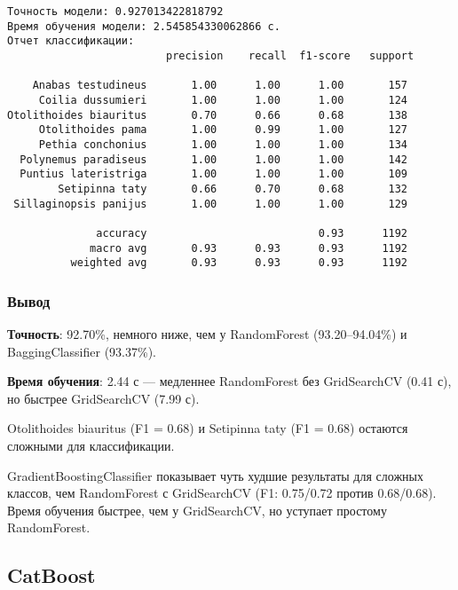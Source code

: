 \documentclass[14pt,a4paper,oneside]{extarticle}
\begin{document}
    \begin{Verbatim}[commandchars=\\\{\}]
Точность модели: 0.927013422818792
Время обучения модели: 2.545854330062866 с.
Отчет классификации:
                         precision    recall  f1-score   support

    Anabas testudineus       1.00      1.00      1.00       157
     Coilia dussumieri       1.00      1.00      1.00       124
Otolithoides biauritus       0.70      0.66      0.68       138
     Otolithoides pama       1.00      0.99      1.00       127
     Pethia conchonius       1.00      1.00      1.00       134
  Polynemus paradiseus       1.00      1.00      1.00       142
  Puntius lateristriga       1.00      1.00      1.00       109
        Setipinna taty       0.66      0.70      0.68       132
 Sillaginopsis panijus       1.00      1.00      1.00       129

              accuracy                           0.93      1192
             macro avg       0.93      0.93      0.93      1192
          weighted avg       0.93      0.93      0.93      1192

    \end{Verbatim}

    \hypertarget{ux432ux44bux432ux43eux434}{%
\subsubsection*{\large Вывод}\label{ux432ux44bux432ux43eux434}}

\textbf{Точность}: 92.70\%, немного ниже, чем у RandomForest
(93.20--94.04\%) и BaggingClassifier (93.37\%).

\textbf{Время обучения}: 2.44 с --- медленнее RandomForest без
GridSearchCV (0.41 с), но быстрее GridSearchCV (7.99 с).

Otolithoides biauritus (F1 = 0.68) и Setipinna taty (F1 = 0.68) остаются
сложными для классификации.

GradientBoostingClassifier показывает чуть худшие результаты для сложных
классов, чем RandomForest с GridSearchCV (F1: 0.75/0.72 против
0.68/0.68). Время обучения быстрее, чем у GridSearchCV, но уступает
простому RandomForest.

\clearpage

    \hypertarget{catboost}{%
\subsection{CatBoost}\label{catboost}}
\end{document}
